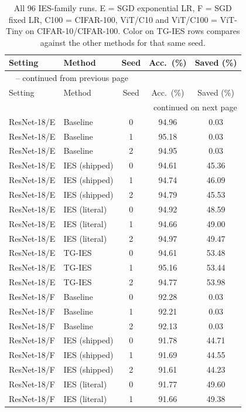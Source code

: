 \documentclass{article}
\newcommand{\win}[1]{\cellcolor{tgwin}#1}
\newcommand{\lose}[1]{\cellcolor{tglose}#1}
\theoremstyle{plain}
\theoremstyle{definition}
\theoremstyle{remark}
\begin{document}
\begingroup
\small
\begin{longtable}{llccc}
\caption{All 96 IES-family runs. E = SGD exponential LR, F = SGD fixed LR, C100 = CIFAR-100, ViT/C10 and ViT/C100 = ViT-Tiny on CIFAR-10/CIFAR-100. Color on TG-IES rows compares against the other methods for that same seed.}
\label{tab:fullresults} \\
\toprule
Setting & Method & Seed & Acc.\ (\%) & Saved (\%) \\
\midrule
\endfirsthead
\multicolumn{5}{l}{\tablename~\thetable{} -- continued from previous page} \\
\toprule
Setting & Method & Seed & Acc.\ (\%) & Saved (\%) \\
\midrule
\endhead
\midrule
\multicolumn{5}{r}{continued on next page} \\
\endfoot
\bottomrule
\endlastfoot
ResNet-18/E & Baseline & 0 & 94.96 & 0.03 \\
ResNet-18/E & Baseline & 1 & 95.18 & 0.03 \\
ResNet-18/E & Baseline & 2 & 94.95 & 0.03 \\
ResNet-18/E & IES (shipped) & 0 & 94.61 & 45.36 \\
ResNet-18/E & IES (shipped) & 1 & 94.74 & 46.09 \\
ResNet-18/E & IES (shipped) & 2 & 94.79 & 45.53 \\
ResNet-18/E & IES (literal) & 0 & 94.92 & 48.59 \\
ResNet-18/E & IES (literal) & 1 & 94.66 & 49.00 \\
ResNet-18/E & IES (literal) & 2 & 94.97 & 49.47 \\
ResNet-18/E & TG-IES & 0 & \lose{94.61} & \win{53.48} \\
ResNet-18/E & TG-IES & 1 & \lose{95.16} & \win{53.44} \\
ResNet-18/E & TG-IES & 2 & \lose{94.77} & \win{53.98} \\
ResNet-18/F & Baseline & 0 & 92.28 & 0.03 \\
ResNet-18/F & Baseline & 1 & 92.21 & 0.03 \\
ResNet-18/F & Baseline & 2 & 92.13 & 0.03 \\
ResNet-18/F & IES (shipped) & 0 & 91.78 & 44.71 \\
ResNet-18/F & IES (shipped) & 1 & 91.69 & 44.55 \\
ResNet-18/F & IES (shipped) & 2 & 91.61 & 44.23 \\
ResNet-18/F & IES (literal) & 0 & 91.77 & 49.60 \\
ResNet-18/F & IES (literal) & 1 & 91.66 & 49.38 \\

\end{longtable}
\end{document}

